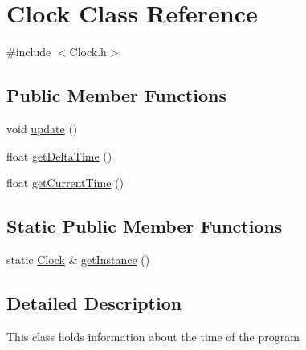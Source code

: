 \hypertarget{classClock}{\section{Clock Class Reference}
\label{classClock}
}


{\ttfamily \#include $<$Clock.\-h$>$}

\subsection*{Public Member Functions}
\begin{DoxyCompactItemize}
\item 
void \hyperlink{classClock_ae7c6708cf04b233655b501a97bb1e802}{update} ()
\item 
float \hyperlink{classClock_aa6bbd46f251a01c56f09ecfd89bcf324}{get\-Delta\-Time} ()
\item 
float \hyperlink{classClock_a7209991f330ee3d13557ac83ece52a5a}{get\-Current\-Time} ()
\end{DoxyCompactItemize}
\subsection*{Static Public Member Functions}
\begin{DoxyCompactItemize}
\item 
static \hyperlink{classClock}{Clock} \& \hyperlink{classClock_ab177004c1bc5df14899133b1e18c9bdb}{get\-Instance} ()
\end{DoxyCompactItemize}


\subsection{Detailed Description}
This class holds information about the time of the program 

